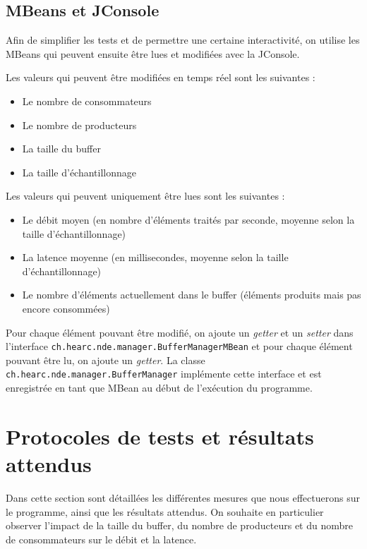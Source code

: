 \documentclass[
  french,
  a4paper,
]{scrartcl}
\begin{document}
\subsection{MBeans et JConsole}

Afin de simplifier les tests et de permettre une certaine interactivité, on utilise 
les MBeans qui peuvent ensuite être lues et modifiées avec la JConsole. 

Les valeurs qui peuvent être modifiées en temps réel sont les suivantes :

\begin{itemize}
  \item Le nombre de consommateurs 
  \item Le nombre de producteurs 
  \item La taille du buffer
  \item La taille d'échantillonnage
\end{itemize}

Les valeurs qui peuvent uniquement être lues sont les suivantes : 

\begin{itemize}
  \item Le débit moyen (en nombre d'éléments traités par seconde, moyenne selon la taille d'échantillonnage)
  \item La latence moyenne (en millisecondes, moyenne selon la taille d'échantillonnage)
  \item Le nombre d'éléments actuellement dans le buffer (éléments produits mais pas encore consommées)
\end{itemize}

Pour chaque élément pouvant être modifié, on ajoute un \textit{getter} et un \textit{setter} dans l'interface
\lstinline{ch.hearc.nde.manager.BufferManagerMBean} et pour chaque élément pouvant être lu, on ajoute un \textit{getter}. 
La classe \lstinline{ch.hearc.nde.manager.BufferManager} implémente cette interface et est enregistrée en tant que MBean
au début de l'exécution du programme.


\section{Protocoles de tests et résultats attendus}

Dans cette section sont détaillées les différentes mesures que nous effectuerons sur le programme, 
ainsi que les résultats attendus. On souhaite en particulier observer l'impact de la taille du buffer, 
du nombre de producteurs et du nombre de consommateurs sur le débit et la latence. 
\end{document}
